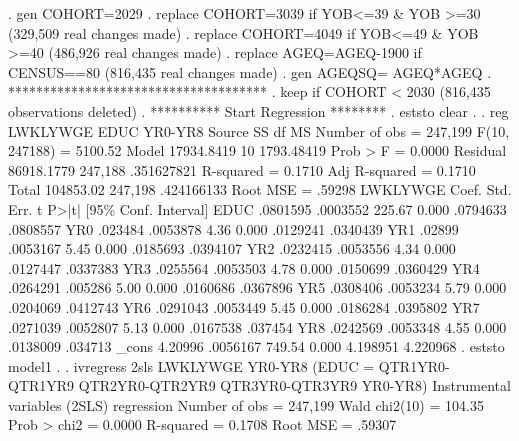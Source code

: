. gen COHORT=2029
{\smallskip}
. replace COHORT=3039 if YOB<=39 \& YOB >=30
(329,509 real changes made)
{\smallskip}
. replace COHORT=4049 if YOB<=49 \& YOB >=40
(486,926 real changes made)
{\smallskip}
. replace AGEQ=AGEQ-1900 if CENSUS==80
(816,435 real changes made)
{\smallskip}
. gen AGEQSQ= AGEQ*AGEQ
{\smallskip}
. *************************************
. keep if COHORT < 2030
(816,435 observations deleted)
{\smallskip}
. **********  Start Regression ********
. eststo clear
{\smallskip}
. 
. reg  LWKLYWGE EDUC  YR0-YR8 
{\smallskip}
      Source {\VBAR}       SS           df       MS      Number of obs   =   247,199
   F(10, 247188)   =   5100.52
       Model {\VBAR}  17934.8419        10  1793.48419   Prob > F        =    0.0000
    Residual {\VBAR}  86918.1779   247,188  .351627821   R-squared       =    0.1710
   Adj R-squared   =    0.1710
       Total {\VBAR}   104853.02   247,198  .424166133   Root MSE        =    .59298
{\smallskip}
    LWKLYWGE {\VBAR}      Coef.   Std. Err.      t    P>|t|     [95\% Conf. Interval]
        EDUC {\VBAR}   .0801595   .0003552   225.67   0.000     .0794633    .0808557
         YR0 {\VBAR}    .023484   .0053878     4.36   0.000     .0129241    .0340439
         YR1 {\VBAR}     .02899   .0053167     5.45   0.000     .0185693    .0394107
         YR2 {\VBAR}   .0232415   .0053556     4.34   0.000     .0127447    .0337383
         YR3 {\VBAR}   .0255564   .0053503     4.78   0.000     .0150699    .0360429
         YR4 {\VBAR}   .0264291    .005286     5.00   0.000     .0160686    .0367896
         YR5 {\VBAR}   .0308406   .0053234     5.79   0.000     .0204069    .0412743
         YR6 {\VBAR}   .0291043   .0053449     5.45   0.000     .0186284    .0395802
         YR7 {\VBAR}   .0271039   .0052807     5.13   0.000     .0167538     .037454
         YR8 {\VBAR}   .0242569   .0053348     4.55   0.000     .0138009     .034713
       _cons {\VBAR}    4.20996   .0056167   749.54   0.000     4.198951    4.220968
{\smallskip}
. eststo model1
{\smallskip}
. 
. ivregress 2sls LWKLYWGE YR0-YR8 (EDUC = QTR1YR0-QTR1YR9 QTR2YR0-QTR2YR9 QTR3YR0-QTR3YR9 YR0-YR8)
{\smallskip}
Instrumental variables (2SLS) regression          Number of obs   =    247,199
                                                  Wald chi2(10)   =     104.35
                                                  Prob > chi2     =     0.0000
                                                  R-squared       =     0.1708
                                                  Root MSE        =     .59307
